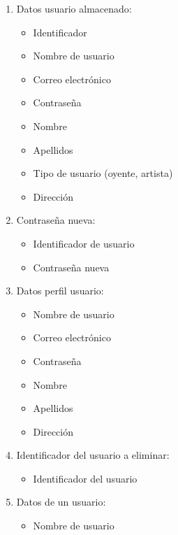 \documentclass[12pt,a4paper]{article}
\begin{document}
\begin{enumerate}[label=\textnormal{RD\arabic*.}]
	\item Datos usuario almacenado: \label{rd20}
		\begin{itemize}
			\item Identificador
			\item Nombre de usuario
			\item Correo electrónico
			\item Contraseña
			\item Nombre
			\item Apellidos
			\item Tipo de usuario (oyente, artista)
			\item Dirección
		\end{itemize}
		
	\item Contraseña nueva: \label{rd21}
		\begin{itemize}
			\item Identificador de usuario
			\item Contraseña nueva
		\end{itemize}
		
	\item Datos perfil usuario: \label{rd22}
		\begin{itemize}
			\item Nombre de usuario
			\item Correo electrónico
			\item Contraseña
			\item Nombre
			\item Apellidos
			\item Dirección
		\end{itemize}
		
	\item Identificador del usuario a eliminar: \label{rd23}
		\begin{itemize}
			\item Identificador del usuario
		\end{itemize}
		
		
	\item Datos de un usuario:  \label{rd24}
		\begin{itemize}
			\item Nombre de usuario
		\end{itemize}


\end{enumerate}
\end{document}
